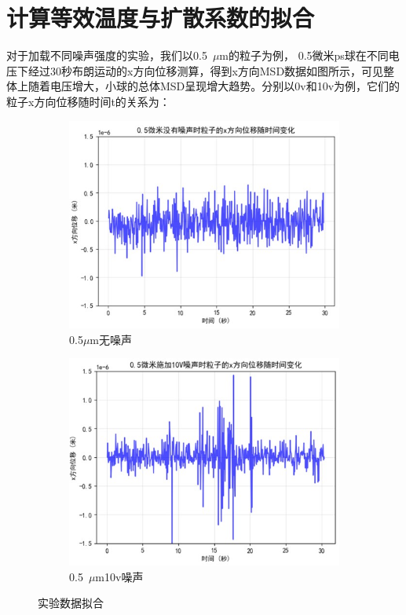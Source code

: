 \documentclass[a4paper]{report} %
\begin{document}
\section{计算等效温度与扩散系数的拟合}
对于加载不同噪声强度的实验，我们以0.5~$\mu$m的粒子为例，
0.5微米ps球在不同电压下经过30秒布朗运动的x方向位移测算，得到x方向MSD数据如图所示，可见整体上随着电压增大，小球的总体MSD呈现增大趋势。分别以0v和10v为例，它们的粒子x方向位移随时间t的关系为：\par
\begin{figure}[H]
    \centering
    \begin{subfigure}{0.45\textwidth}
        \includegraphics[width=\linewidth]{粒子1.jpg}
        \caption{0.5$\mu$m无噪声}
    \end{subfigure}
    \begin{subfigure}{0.45\textwidth}
        \includegraphics[width=\linewidth]{粒子2.jpg}
        \caption{0.5~$\mu$m10v噪声}
    \end{subfigure}

    \caption{实验数据拟合}
\end{figure}
\end{document}
